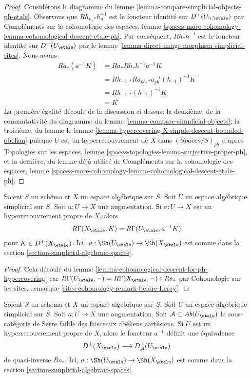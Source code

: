 \begin{proof}
Considérons le diagramme du lemme \ref{lemma-compare-simplicial-objects-ph-etale}.
Observons que $Rh_{n, *}h_n^{-1}$ est le foncteur identité
sur $D^+(U_{n, \etale})$ par
Compléments sur la cohomologie des espaces, lemme
\ref{spaces-more-cohomology-lemma-cohomological-descent-etale-ph}.
Par conséquent, $Rh_*h^{-1}$ est le foncteur identité sur
$D^+(U_\etale)$ par
le lemme \ref{lemma-direct-image-morphism-simplicial-sites}.
Nous avons
\begin{align*}
Ra_*(a^{-1}K)
& =
Ra_*Rh_*h^{-1}a^{-1}K \\
& =
Rh_{-1, *}Ra_{ph, *}a_{ph}^{-1}(h_{-1})^{-1}K \\
& =
Rh_{-1, *}(h_{-1})^{-1}K \\
& =
K
\end{align*}
La première égalité découle de la discussion ci-dessus; la deuxième,
de la commutativité du diagramme du lemme
\ref{lemma-compare-simplicial-objects}; la troisième, du lemme
le lemme \ref{lemma-hypercovering-X-simple-descent-bounded-abelian}
puisque $U$ est un hyperrecouvrement de $X$ dans $(\textit{Spaces}/S)_{ph}$
d'après Topologies sur les espaces, lemme
\ref{spaces-topologies-lemma-surjective-proper-ph},
et la dernière, du lemme déjà utilisé de
Compléments sur la cohomologie des espaces, lemme
\ref{spaces-more-cohomology-lemma-cohomological-descent-etale-ph}.
\end{proof}

\begin{lemma}
\label{lemma-compute-via-ph-hypercovering}
Soient $S$ un schéma et $X$ un espace algébrique sur $S$.
Soit $U$ un espace algébrique simplicial sur $S$. Soit $a : U \to X$
une augmentation. Si $a : U \to X$ est un hyperrecouvrement propre de $X$, alors
$$
R\Gamma(X_\etale, K) = R\Gamma(U_\etale, a^{-1}K)
$$
pour $K \in D^+(X_\etale)$. Ici, $a : \Sh(U_\etale) \to \Sh(X_\etale)$
est comme dans la section \ref{section-simplicial-algebraic-spaces}.
\end{lemma}

\begin{proof}
Cela découle du lemme
\ref{lemma-cohomological-descent-for-ph-hypercovering}
car $R\Gamma(U_\etale, -) = R\Gamma(X_\etale, -) \circ Ra_*$ par
Cohomologie sur les sites, remarque \ref{sites-cohomology-remark-before-Leray}.
\end{proof}

\begin{lemma}
\label{lemma-ph-hypercovering-equivalence-bounded}
Soient $S$ un schéma et $X$ un espace algébrique sur $S$.
Soit $U$ un espace algébrique simplicial sur $S$. Soit $a : U \to X$
une augmentation.
Soit $\mathcal{A} \subset \textit{Ab}(U_\etale)$
la sous-catégorie de Serre faible des faisceaux abéliens cartésiens.
Si $U$ est un hyperrecouvrement propre de $X$, alors
le foncteur $a^{-1}$ définit une équivalence
$$
D^+(X_\etale) \longrightarrow D_\mathcal{A}^+(U_\etale)
$$
de quasi-inverse $Ra_*$. Ici, $a : \Sh(U_\etale) \to \Sh(X_\etale)$
est comme dans la section \ref{section-simplicial-algebraic-spaces}.
\end{lemma}

